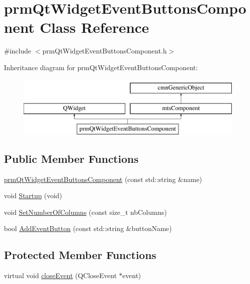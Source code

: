 \hypertarget{classprm_qt_widget_event_buttons_component}{}\section{prm\+Qt\+Widget\+Event\+Buttons\+Component Class Reference}
\label{classprm_qt_widget_event_buttons_component}


{\ttfamily \#include $<$prm\+Qt\+Widget\+Event\+Buttons\+Component.\+h$>$}

Inheritance diagram for prm\+Qt\+Widget\+Event\+Buttons\+Component\+:\begin{figure}[H]
\begin{center}
\leavevmode
\includegraphics[height=3.000000cm]{d9/dd0/classprm_qt_widget_event_buttons_component}
\end{center}
\end{figure}
\subsection*{Public Member Functions}
\begin{DoxyCompactItemize}
\item 
\hyperlink{classprm_qt_widget_event_buttons_component_a364df2f185553abac1b0aafb0c118122}{prm\+Qt\+Widget\+Event\+Buttons\+Component} (const std\+::string \&name)
\item 
void \hyperlink{classprm_qt_widget_event_buttons_component_aebcb8482c578eb77f45ae6aafa6b7d3b}{Startup} (void)
\item 
void \hyperlink{classprm_qt_widget_event_buttons_component_a166d03defc93acb2beccc7f083818837}{Set\+Number\+Of\+Columns} (const size\+\_\+t nb\+Columns)
\item 
bool \hyperlink{classprm_qt_widget_event_buttons_component_a3f2fcdda3a6fb7430d31affddd917e43}{Add\+Event\+Button} (const std\+::string \&button\+Name)
\end{DoxyCompactItemize}
\subsection*{Protected Member Functions}
\begin{DoxyCompactItemize}
\item 
virtual void \hyperlink{classprm_qt_widget_event_buttons_component_a80ea695016d5c35d628cd91785d23b38}{close\+Event} (Q\+Close\+Event $\ast$event)
\end{DoxyCompactItemize}
